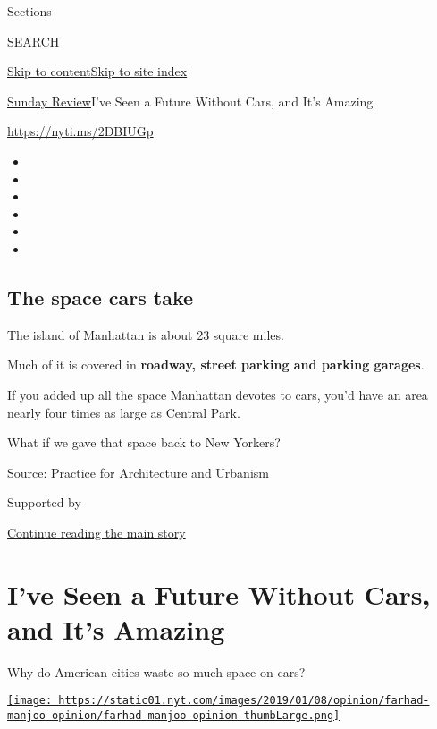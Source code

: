 Sections

SEARCH

\protect\hyperlink{site-content}{Skip to
content}\protect\hyperlink{site-index}{Skip to site index}

\href{/section/opinion/sunday}{Sunday Review}\textbar{}I've Seen a
Future Without Cars, and It's Amazing

\href{https://nyti.ms/2DBIUGp}{https://nyti.ms/2DBIUGp}

\begin{itemize}
\item
\item
\item
\item
\item
\item
\end{itemize}

\hypertarget{the-space-cars-take}{%
\subsection{The space cars take}\label{the-space-cars-take}}

The island of Manhattan is about 23 square miles.

Much of it is covered in \textbf{roadway, street parking and parking
garages}.

If you added up all the space Manhattan devotes to cars, you'd have an
area nearly four times as large as Central Park.

What if we gave that space back to New Yorkers?

Source: Practice for Architecture and Urbanism

Supported by

\protect\hyperlink{after-sponsor}{Continue reading the main story}

\hypertarget{ive-seen-a-future-without-cars-and-its-amazing}{%
\section{I've Seen a Future Without Cars, and It's
Amazing}\label{ive-seen-a-future-without-cars-and-its-amazing}}

Why do American cities waste so much space on cars?

\href{https://www.nytimes.com/by/farhad-manjoo}{\texttt{[image: https://static01.nyt.com/images/2019/01/08/opinion/farhad-manjoo-opinion/farhad-manjoo-opinion-thumbLarge.png]}}

